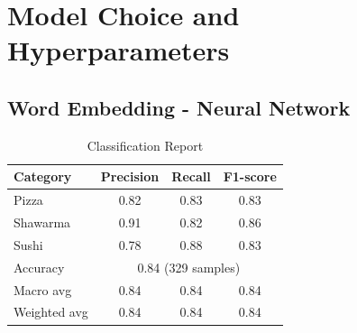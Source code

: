 \section{Model Choice and Hyperparameters}

\subsection{Word Embedding - Neural Network}
\begin{table}[h]
    \centering
    \begin{tabular}{lccc}
        \hline
        Category     & Precision                              & Recall & F1-score \\
        \hline
        Pizza        & 0.82                                   & 0.83   & 0.83     \\
        Shawarma     & 0.91                                   & 0.82   & 0.86     \\
        Sushi        & 0.78                                   & 0.88   & 0.83     \\
        \hline
        Accuracy     & \multicolumn{3}{c}{0.84 (329 samples)}                     \\
        Macro avg    & 0.84                                   & 0.84   & 0.84     \\
        Weighted avg & 0.84                                   & 0.84   & 0.84     \\
        \hline
    \end{tabular}
    \caption{Classification Report}
\end{table}

